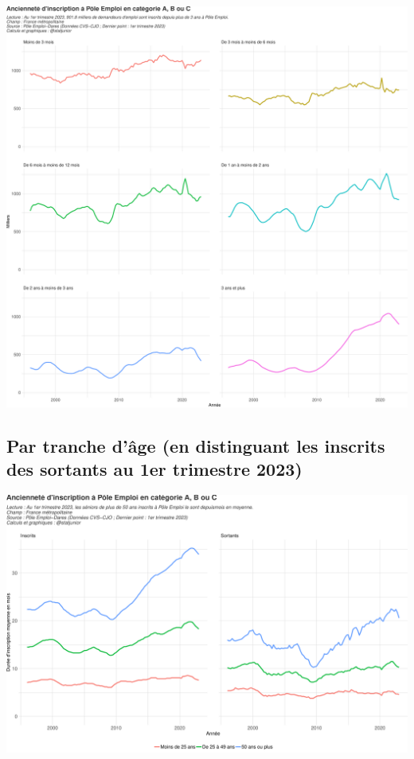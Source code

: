 \documentclass[
  paper=a4,
  ,captions=tableheading
]{scrartcl}
\begin{document}
\includegraphics{rapport_pdf_demandeurs_emploi_pole_emploi_files/figure-latex/unnamed-chunk-11-1.pdf}

\hypertarget{par-tranche-duxe2ge-en-distinguant-les-inscrits-des-sortants-au-1er-trimestre-2023}{%
\subsection{Par tranche d'âge (en distinguant les inscrits des sortants
au 1er trimestre
2023)}\label{par-tranche-duxe2ge-en-distinguant-les-inscrits-des-sortants-au-1er-trimestre-2023}}

\includegraphics{rapport_pdf_demandeurs_emploi_pole_emploi_files/figure-latex/unnamed-chunk-13-1.pdf}
\end{document}
